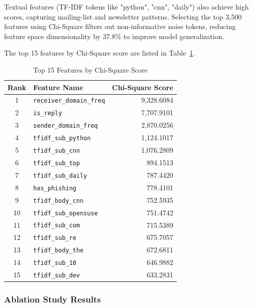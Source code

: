 \documentclass[12pt,a4paper]{article}
\begin{document}
Textual features (TF-IDF tokens like "python", "cnn", "daily") also achieve high scores, capturing mailing-list and newsletter patterns. Selecting the top 3,500 features using Chi-Square filters out non-informative noise tokens, reducing feature space dimensionality by 37.8\% to improve model generalization.

The top 15 features by Chi-Square score are listed in Table~\ref{tab:chi2_features}.
\begin{table}[H]
\centering
\caption{Top 15 Features by Chi-Square Score}
\label{tab:chi2_features}
\begin{tabular}{clr}
\toprule
\textbf{Rank} & \textbf{Feature Name} & \textbf{Chi-Square Score} \\
\midrule
1 & \texttt{receiver\_domain\_freq} & 9,328.6084 \\
2 & \texttt{is\_reply} & 7,707.9101 \\
3 & \texttt{sender\_domain\_freq} & 2,870.0256 \\
4 & \texttt{tfidf\_sub\_python} & 1,124.1017 \\
5 & \texttt{tfidf\_sub\_cnn} & 1,076.2809 \\
6 & \texttt{tfidf\_sub\_top} & 894.1513 \\
7 & \texttt{tfidf\_sub\_daily} & 787.4420 \\
8 & \texttt{has\_phishing} & 778.4101 \\
9 & \texttt{tfidf\_body\_cnn} & 752.5935 \\
10 & \texttt{tfidf\_sub\_opensuse} & 751.4742 \\
11 & \texttt{tfidf\_sub\_com} & 715.5389 \\
12 & \texttt{tfidf\_sub\_re} & 675.7057 \\
13 & \texttt{tfidf\_body\_the} & 672.6811 \\
14 & \texttt{tfidf\_sub\_10} & 646.9882 \\
15 & \texttt{tfidf\_sub\_dev} & 633.2831 \\
\bottomrule
\end{tabular}
\end{table}

\subsubsection{Ablation Study Results}
\begin{table}[H]
\centering
\caption{Ablation Study Results on Test Set}
\label{tab:ablation}
\end{table}
\end{document}
